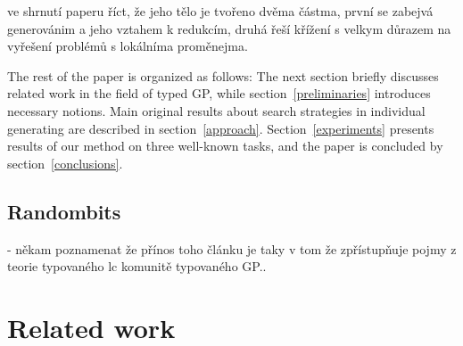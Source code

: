 \documentclass{sig-alternate}
\newcommand{\red}[1]{{\color{red} #1}}
\newcommand{\nehodi}[1]{{\color{yellow} #1}}
\begin{document}

\red{ve shrnutí paperu říct, že jeho tělo je tvořeno dvěma částma,
první se zabejvá generovánim a jeho vztahem k redukcím, druhá řeší křížení
s velkym důrazem na vyřešení problémů s lokálníma proměnejma.}

The rest of the paper is organized as follows: The next section briefly discusses related work in the field of typed GP, while section~\ref{preliminaries} introduces necessary notions. Main original results about search strategies in individual generating are described in section~\ref{approach}. Section~\ref{experiments} presents results of our method on three well-known tasks, and the paper is concluded by section~\ref{conclusions}.

\subsection{\red{Randombits}}
\red{

- někam poznamenat že přínos toho článku je taky v tom že zpřístupňuje pojmy z teorie typovaného lc komunitě typovaného GP.. 


}



\section{Related work}
\label{related}
\end{document}

